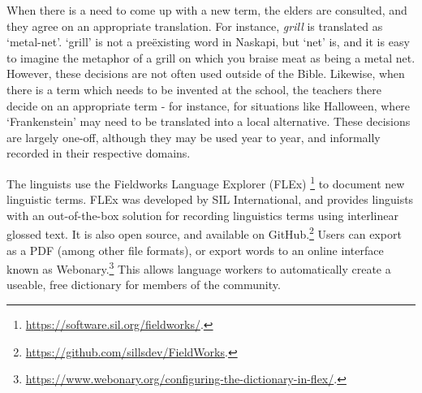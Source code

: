 When there is a need to come up with a new term, the elders are consulted, and they agree on an appropriate translation. For instance, {\it grill} is translated as `metal-net'. `grill' is not a  pre\"{e}xisting word in Naskapi, but `net' is, and it is easy to imagine the metaphor of a grill on which you braise meat as being a metal net. However, these decisions are not often used outside of the Bible. Likewise, when there is a term which needs to be invented at the school, the teachers there decide on an appropriate term - for instance, for situations like Halloween, where `Frankenstein' may need to be translated into a local alternative. These decisions are largely one-off, although they may be used year to year, and informally recorded in their respective domains.

The linguists use the Fieldworks Language Explorer (FLEx) \footnote{\href{https://software.sil.org/fieldworks/}{https://software.sil.org/fieldworks/}. } to document new linguistic terms. FLEx was developed by SIL International, and provides linguists with an out-of-the-box solution for recording linguistics terms using interlinear glossed text. It is also open source, and available on GitHub.\footnote{\href{https://github.com/sillsdev/FieldWorks}{https://github.com/sillsdev/FieldWorks}. } Users can export as a PDF (among other file formats), or export words to an online interface known as Webonary.\footnote{\href{https://www.webonary.org/configuring-the-dictionary-in-flex/}{https://www.webonary.org/configuring-the-dictionary-in-flex/}. } This allows language workers to automatically create a useable, free dictionary for members of the community.

